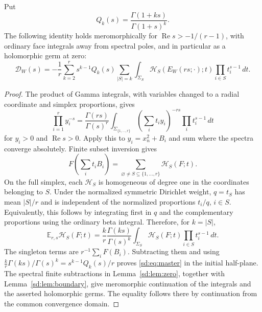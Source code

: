 \begin{theorem}
\label{sd:thm:master}
Put
\begin{equation}\label{sd:eq:Q}
 Q_k(s)=\frac{\Gamma(1+ks)}{\Gamma(1+s)^k}.
\end{equation}
The following identity holds meromorphically for
$\operatorname{Re}s>-1/(r-1)$, with ordinary face integrals away
from spectral poles, and in particular as a holomorphic germ at zero:
\begin{equation}\label{sd:eq:master}
 \boxed{\displaystyle
 \mathcal D_W(s)=-\frac1r\sum_{k=2}^{r}s^{k-1}Q_k(s)
   \sum_{|S|=k}\int_{\Sigma_S}
     \mathcal H_S(E_W(rs;\cdot);t)
                         \prod_{i\in S}t_i^{s-1}\,dt.}
\end{equation}
\end{theorem}
\begin{proof}
The product of Gamma integrals, with variables changed to a radial
coordinate and simplex proportions, gives
\[
 \prod_{i=1}^r y_i^{-s}
 =\frac{\Gamma(rs)}{\Gamma(s)^r}
   \int_{\Sigma_{\{1,\ldots,r\}}}
        \left(\sum_i t_i y_i\right)^{-rs}
                            \prod_i t_i^{s-1}\,dt
\]
for $y_i>0$ and $\operatorname{Re}s>0$.  Apply this to
$y_i=x_n^2+B_i$ and sum where the spectra converge absolutely.
Finite subset inversion gives
\[
 F\!\left(\sum_i t_iB_i\right)
       =\sum_{\varnothing\ne S\subseteq\{1,\ldots,r\}}
                    \mathcal H_S(F;t).
\]
On the full simplex, each $\mathcal H_S$ is homogeneous of degree one
in the coordinates belonging to $S$.  Under the normalized symmetric
Dirichlet weight, $q=t_S$ has mean $|S|/r$ and is independent of the
normalized proportions $t_i/q$, $i\in S$.  Equivalently, this follows
by integrating first in $q$ and the complementary proportions using
the ordinary beta integral.  Therefore, for $k=|S|$,
\[
 \mathbb E_{r,s}\mathcal H_S(F;t)
 =\frac{k}{r}\frac{\Gamma(ks)}{\Gamma(s)^k}
       \int_{\Sigma_S}\mathcal H_S(F;t)
                                 \prod_{i\in S}t_i^{s-1}\,dt.
\]
The singleton terms are $r^{-1}\sum_iF(B_i)$.  Subtracting them and
using
$\frac{k}{r}\Gamma(ks)/\Gamma(s)^k=s^{k-1}Q_k(s)/r$
proves \eqref{sd:eq:master} in the initial half-plane.
The spectral finite subtractions in Lemma~\ref{sd:lem:zero}, together
with Lemma~\ref{sd:lem:boundary}, give meromorphic continuation of the
integrals and the asserted holomorphic germs.  The equality follows
there by continuation from the common convergence domain.
\end{proof}

